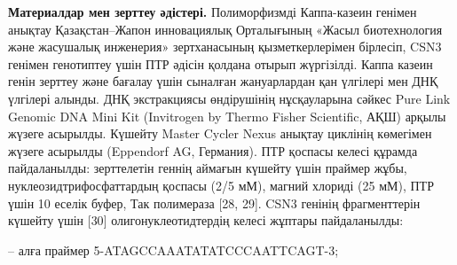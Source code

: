 \begin{multicols}{2}
{\bfseries Материалдар мен зерттеу әдістері.} Полиморфизмді Каппа-казеин
генімен анықтау Қазақстан--Жапон инновациялық Орталығының «Жасыл
биотехнология және жасушалық инженерия» зертханасының қызметкерлерімен
бірлесіп, CSN3 генімен генотиптеу үшін ПТР әдісін қолдана отырып
жүргізілді. Каппа казеин генін зерттеу және бағалау үшін сыналған
жануарлардан қан үлгілері мен ДНҚ үлгілері алынды. ДНҚ экстракциясы
өндірушінің нұсқауларына сәйкес Pure Link Genomic DNA Mini Kit
(Invitrogen by Thermo Fisher Scientific, АҚШ) арқылы жүзеге асырылды.
Күшейту Master Cycler Nexus анықтау циклінің көмегімен жүзеге асырылды
(Eppendorf AG, Германия). ПТР қоспасы келесі құрамда пайдаланылды:
зерттелетін геннің аймағын күшейту үшін праймер жұбы,
нуклеозидтрифосфаттардың қоспасы (2/5 мМ), магний хлориді (25 мМ), ПТР
үшін 10 еселік буфер, Так полимераза {[}28, 29{]}. CSN3 генінің
фрагменттерін күшейту үшін {[}30{]} олигонуклеотидтердің келесі жұптары
пайдаланылды:
\end{multicols}

-- алға праймер
5\textquotesingle-ATAGCCAAATATATCCCAATTCAGT-3\textquotesingle;

